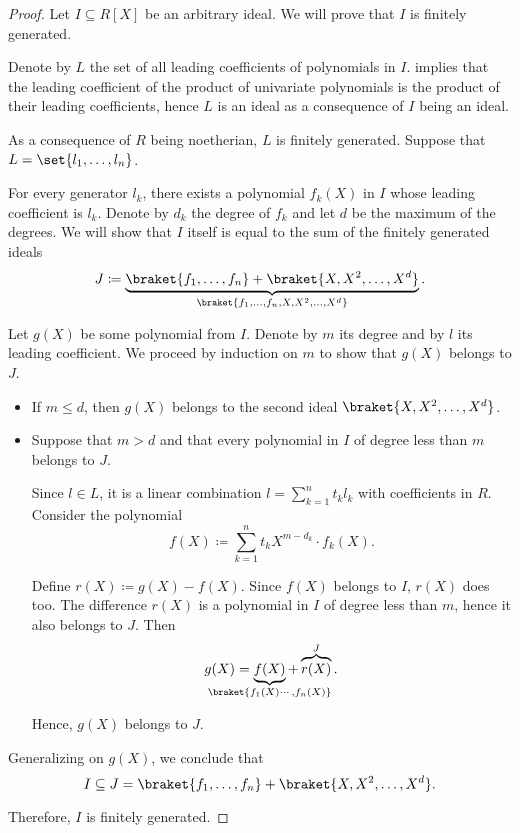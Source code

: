 \begin{proof}
  Let \( I \subseteq R[X] \) be an arbitrary ideal. We will prove that \( I \) is finitely generated.

  Denote by \( L \) the set of all leading coefficients of polynomials in \( I \).  implies that the leading coefficient of the product of univariate polynomials is the product of their leading coefficients, hence \( L \) is an ideal as a consequence of \( I \) being an ideal.

  As a consequence of \( R \) being noetherian, \( L \) is finitely generated. Suppose that \( L = \set{ l_1, \ldots, l_n } \).

  For every generator \( l_k \), there exists a polynomial \( f_k(X) \) in \( I \) whose leading coefficient is \( l_k \). Denote by \( d_k \) the degree of \( f_k \) and let \( d \) be the maximum of the degrees. We will show that \( I \) itself is equal to the sum of the finitely generated ideals
  \begin{equation*}
    J \coloneqq \underbrace{ \braket{ f_1, \ldots, f_n } + \braket{ X, X^2, \ldots, X^d } }_{ \braket{ f_1, \ldots, f_n, X, X^2, \ldots, X^d } }.
  \end{equation*}

  Let \( g(X) \) be some polynomial from \( I \). Denote by \( m \) its degree and by \( l \) its leading coefficient. We proceed by induction on \( m \) to show that \( g(X) \) belongs to \( J \).
  \begin{itemize}
    \item If \( m \leq d \), then \( g(X) \) belongs to the second ideal \( \braket{ X, X^2, \ldots, X^d } \).

    \item Suppose that \( m > d \) and that every polynomial in \( I \) of degree less than \( m \) belongs to \( J \).

    Since \( l \in L \), it is a linear combination \( l = \sum_{k=1}^n t_k l_k \) with coefficients in \( R \). Consider the polynomial
    \begin{equation*}
      f(X) \coloneqq \sum_{k=1}^n t_k X^{m - d_k} \cdot f_k(X).
    \end{equation*}

    Define \( r(X) \coloneqq g(X) - f(X) \). Since \( f(X) \) belongs to \( I \), \( r(X) \) does too. The difference \( r(X) \) is a polynomial in \( I \) of degree less than \( m \), hence it also belongs to \( J \). Then
    \begin{equation*}
      g(X) = \underbrace{ f(X) }_{\mathclap{\braket{ f_1(X) \cdots, f_n(X) }}} + \overbrace{ r(X) }^J.
    \end{equation*}

    Hence, \( g(X) \) belongs to \( J \).
  \end{itemize}

  Generalizing on \( g(X) \), we conclude that
  \begin{equation*}
    I \subseteq J = \braket{ f_1, \ldots, f_n } + \braket{ X, X^2, \ldots, X^d }.
  \end{equation*}

  Therefore, \( I \) is finitely generated.
\end{proof}
